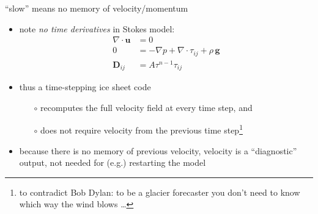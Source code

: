 \begin{frame}{``slow'' means no memory of velocity/momentum}

\begin{itemize}
\item note \emph{no time derivatives} in Stokes model:
\scriptsize
\begin{align*}
\nabla \cdot \mathbf{u} &= 0 \\
0 &= - \nabla p + \nabla \cdot \tau_{ij} + \rho\, \mathbf{g} \\
\mathbf{D}_{ij} &= A \tau^{n-1} \tau_{ij}
\end{align*}
\normalsize
\item thus a time-stepping ice sheet code
  \begin{itemize}
  \item[$\circ$] recomputes the full velocity field at every time step, and
  \item[$\circ$] does not require velocity from the previous time step\footnote{to contradict Bob Dylan: to be a glacier forecaster you don't need to know which way the wind blows \dots}
  \end{itemize}

\medskip
\item because there is no memory of previous velocity, velocity is a ``diagnostic'' output, not needed for (e.g.) restarting the model
\end{itemize}
\end{frame}


